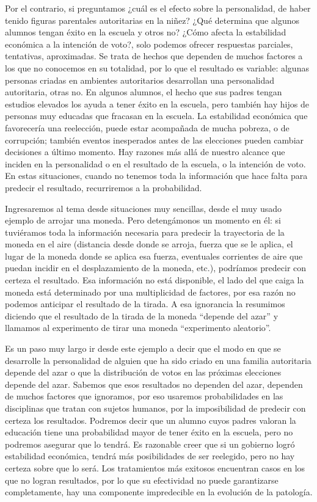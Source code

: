 \documentclass[]{book}
\begin{document}
Por el contrario, si preguntamos ¿cuál es el efecto sobre la
personalidad, de haber tenido figuras parentales autoritarias en la
niñez? ¿Qué determina que algunos alumnos tengan éxito en la escuela y otros no? ¿Cómo afecta la estabilidad económica a la intención de voto?,
solo podemos ofrecer respuestas parciales, tentativas, aproximadas. Se
trata de hechos que dependen de muchos factores a los que no conocemos
en su totalidad, por lo que el resultado es variable: algunas personas
criadas en ambientes autoritarios desarrollan una personalidad
autoritaria, otras no. En algunos alumnos, el hecho que sus padres
tengan estudios elevados los ayuda a tener éxito en la escuela, pero
también hay hijos de personas muy educadas que fracasan en la escuela.
La estabilidad económica que favorecería una reelección, puede estar
acompañada de mucha pobreza, o de corrupción; también eventos
inesperados antes de las elecciones pueden cambiar decisiones a último
momento. Hay razones más allá de nuestro alcance que inciden en la
personalidad o en el resultado de la escuela, o la intención de voto. En
estas situaciones, cuando no tenemos toda la información que hace falta
para predecir el resultado, recurriremos a la probabilidad.

Ingresaremos al tema desde situaciones muy sencillas, desde el muy usado ejemplo de arrojar una moneda. Pero detengámonos un momento en él: si
tuviéramos toda la información necesaria para predecir la trayectoria de
la moneda en el aire (distancia desde donde se arroja, fuerza que se le
aplica, el lugar de la moneda donde se aplica esa fuerza, eventuales
corrientes de aire que puedan incidir en el desplazamiento de la moneda,
etc.), podríamos predecir con certeza el resultado. Esa información no
está disponible, el lado del que caiga la moneda está determinado por
una multiplicidad de factores, por esa razón no podemos anticipar el
resultado de la tirada. A esa ignorancia la resumimos diciendo que el
resultado de la tirada de la moneda ``depende del azar'' y llamamos al
experimento de tirar una moneda ``experimento aleatorio''.

Es un paso muy largo ir desde este ejemplo a decir que el modo en que se desarrolle la personalidad de alguien que ha sido criado en una familia autoritaria depende del azar o que la distribución de votos en las próximas elecciones depende del azar. Sabemos que esos resultados no dependen del azar, dependen de muchos factores que ignoramos, por eso usaremos probabilidades en las disciplinas que tratan con sujetos humanos, por la imposibilidad de predecir con certeza los resultados. Podremos decir que un alumno cuyos padres valoran la educación tiene una probabilidad mayor de tener éxito en la escuela, pero no podremos asegurar que lo tendrá. Es razonable creer que si un gobierno logró estabilidad económica, tendrá más posibilidades de ser reelegido, pero no hay certeza sobre que lo será. Los tratamientos más exitosos encuentran casos en los que no logran resultados, por lo que su efectividad no puede garantizarse completamente, hay una componente impredecible en la evolución de la patología.
\end{document}
